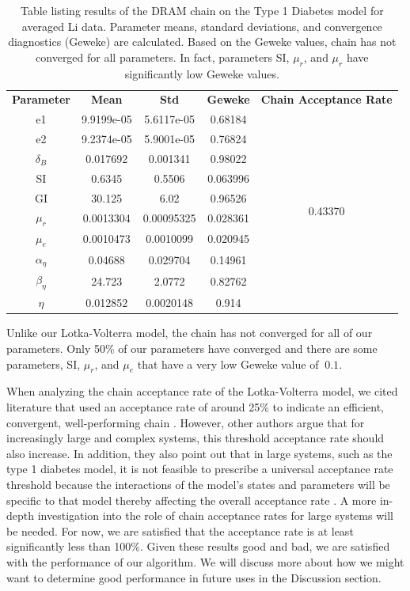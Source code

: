 \documentclass{article}
\begin{document}
\begin{table}[H]
\centering
        \begin{tabular}{c|c c c |c}
            \hline
            \textbf{Parameter} & \textbf{Mean} &  \textbf{Std} & \textbf{ Geweke} &\textbf{Chain Acceptance Rate}\\ 
            \cline{1-5}
            e1 & 9.9199e-05 & 5.6117e-05  &  0.68184 & \multirow{10}{*}{0.43370} \\
            e2 & 9.2374e-05 & 5.9001e-05  & 0.76824\\
            $\delta_B$ & 0.017692 &  0.001341 & 0.98022\\
            SI &  0.6345 & 0.5506  & 0.063996\\
            GI &  30.125 & 6.02  & 0.96526\\
            $\mu_r$ & 0.0013304 & 0.00095325 & 0.028361\\
            $\mu_e$ &  0.0010473 &  0.0010099 & 0.020945\\
            $\alpha_{\eta}$ & 0.04688 &  0.029704 & 0.14961\\
            $\beta_{\eta}$ &  24.723 & 2.0772 & 0.82762\\
            $\eta$ &  0.012852 &  0.0020148 & 0.914
             \\\hline
                          \hline
        \end{tabular}
    \caption{Table listing results of the DRAM chain on the Type 1 Diabetes model for averaged Li data. Parameter means, standard deviations, and convergence diagnostics (Geweke) are calculated. Based on the Geweke values, chain has not converged for all parameters. In fact, parameters SI, $\mu_r$, and $\mu_r$ have significantly low Geweke values.}
    \label{tab:5mcmc} 
\end{table}
Unlike our Lotka-Volterra model, the chain has not converged for all of our parameters. Only 50\% of our parameters have converged and there are some parameters, SI, $\mu_r$, and $\mu_e$ that have a very low Geweke value of $\> 0.1$. 
\par When analyzing the chain acceptance rate of the Lotka-Volterra model, we cited literature that used an acceptance rate of around 25\% to indicate an efficient, convergent, well-performing chain \cite{convergence}. However, other authors argue that for increasingly large and complex systems, this threshold acceptance rate should also increase. In addition, they also point out that in large systems, such as the type 1 diabetes model, it is not feasible to prescribe a universal acceptance rate threshold because the interactions of the model's states and parameters will be specific to that model thereby affecting the overall acceptance rate \cite{converge_threshold}. A more in-depth investigation into the role of chain acceptance rates for large systems will be needed. For now, we are satisfied that the acceptance rate is at least significantly less than 100\%. Given these results good and bad, we are satisfied with the performance of our algorithm. We will discuss more about how we might want to determine good performance in future uses in the Discussion section.
\end{document}
